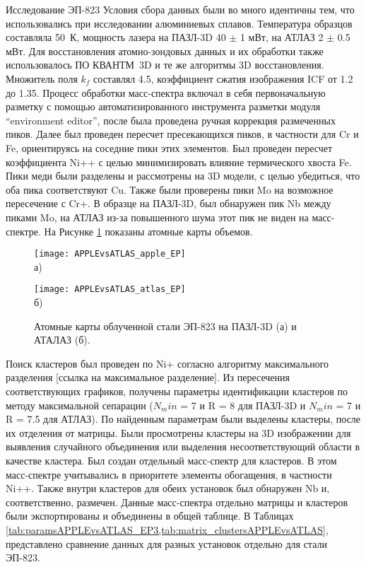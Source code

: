 Исследование ЭП-823
Условия сбора данных были во много идентичны тем, что использовались при исследовании алюминиевых сплавов. Температура образцов составляла 50~К, мощность лазера на ПАЗЛ-3D 40 $\pm$ 1 мВт, на АТЛАЗ 2 $\pm$ 0.5 мВт. Для восстановления атомно-зондовых данных и их обработки также использовалось ПО КВАНТМ~3D и те же алгоритмы 3D восстановления. Множитель поля $k_f$ составлял 4.5, коэффициент сжатия изображения ICF от 1.2 до 1.35. Процесс обработки масс-спектра включал в себя первоначальную разметку с помощью автоматизированного инструмента разметки модуля “environment editor”, после была проведена ручная коррекция размеченных пиков. Далее был проведен пересчет пресекающихся пиков, в частности для Cr и Fe, ориентируясь на соседние пики этих элементов. Был проведен пересчет коэффициента Ni++ с целью минимизировать влияние термического хвоста Fe. Пики меди были разделены и рассмотрены на 3D модели, с целью убедиться, что оба пика соответствуют Cu. Также были проверены пики Mo на возможное пересечение с Cr+. В образце на ПАЗЛ-3D, был обнаружен пик Nb между пиками Mo, на АТЛАЗ из-за повышенного шума этот пик не виден на масс-спектре. На Рисунке \cref{fig:APPLEvsATLAS_EP} показаны атомные карты объемов.

\begin{figure}[h!tb]
	\begin{minipage}[b][][b]{0.49\textwidth}\centering
		\texttt{[image: APPLEvsATLAS\_apple\_EP]} \\ а)
	\end{minipage}
	\begin{minipage}[b][][b]{0.49\textwidth}\centering
		\texttt{[image: APPLEvsATLAS\_atlas\_EP]} \\ б)
	\end{minipage}
	\caption{Атомные карты облученной стали ЭП-823 на ПАЗЛ-3D (а) и АТАЛАЗ (б).}
	\label{fig:APPLEvsATLAS_EP}
\end{figure} 

Поиск кластеров был проведен по Ni+ согласно алгоритму максимального разделения [ссылка на максимальное разделение]. Из пересечения соответствующих графиков, получены параметры идентификации кластеров по методу максимальной сепарации ($N_min$ = 7 и R = 8 для ПАЗЛ-3D и $N_min$ = 7 и R = 7.5 для АТЛАЗ). По найденным параметрам были выделены кластеры, после их отделения от матрицы. Были просмотрены кластеры на 3D изображении для выявления случайного объединения или выделения несоответствующий области в качестве кластера. Был создан отдельный масс-спектр для кластеров. В этом масс-спектре учитывались в приоритете элементы обогащения, в частности Ni++. Также внутри кластеров для обеих установок был обнаружен Nb и, соответственно, размечен. Данные масс-спектра отдельно матрицы и кластеров были экспортированы и объединены в общей таблице. В Таблицах \cref{tab:paramsAPPLEvsATLAS_EP3,tab:matrix_clustersAPPLEvsATLAS}, представлено сравнение данных для разных установок отдельно для стали ЭП-823.

